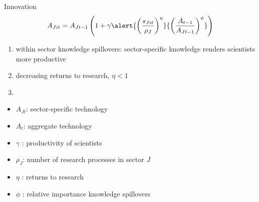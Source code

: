 \documentclass[11pt,aspectratio=169]{beamer}
\begin{document}
\addtocounter{framenumber}{-1}
\begin{frame}{Innovation}
	\large
	\begin{align*}
		A_{Jit}={A_{Jt-1}}\left(1+\gamma\alert{\left(\frac{s_{Jit}}{\rho_J}\right)^{\eta}}{\left(\frac{A_{t-1}}{A_{Jt-1}}\right)^\phi}\right)
	\end{align*}
	\normalsize
	\begin{enumerate}
		\item within sector knowledge spillovers: sector-specific knowledge renders scientists more productive
		\item \alert{decreasing returns to research, $\eta<1$}
		\item[] \ %
	\end{enumerate}
	\small
	\vspace{4mm}
	\hspace{-2mm}
	\begin{minipage}[t!]{0.43\textwidth}
		\vspace{0mm}
		\begin{itemize}
			\item[] $A_{Jt}$: sector-specific technology
			\vspace{-2mm}		
			\item[] $A_t$: aggregate technology
			\vspace{-2mm}
			\item[] $\gamma$ : productivity of scientists
		\end{itemize}
	\end{minipage}
	\vspace{-5mm}
	\begin{minipage}[t!]{0.55\textwidth}
		\vspace{0mm}
		\begin{itemize}	
			\item[] \alert{$\rho_J$: number of research processes in sector $J$}
			\vspace{-2mm}			
			\item[] $\eta$ : returns to research
			\vspace{-2mm}			
			\item[] $\phi$ : relative importance knowledge spillovers
		\end{itemize}
	\end{minipage}
\end{frame}
\end{document}
